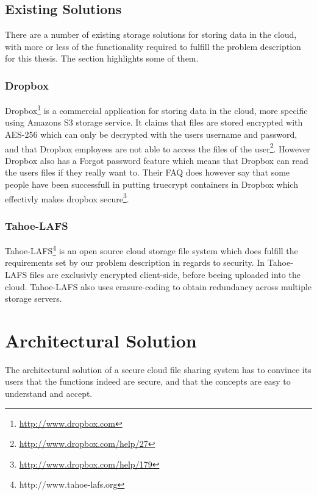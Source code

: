 \documentclass[pdftex,english,10pt,b5paper,twoside]{book}
\begin{document}
\section{Existing Solutions}
There are a number of existing storage solutions for storing data in the cloud,
with more or less of the functionality required to fulfill the problem
description for this thesis. The section highlights some of them.

\subsection{Dropbox} Dropbox\footnote{\url{http://www.dropbox.com}} is a
commercial application for storing data in the cloud, more specific using
Amazons S3 storage service. It claims that files are stored encrypted with
\ac{AES}-256 which can only be decrypted with the users username and password,
and that Dropbox employees are not able to access the files of the
user\footnote{\url{http://www.dropbox.com/help/27}}. However Dropbox also has a
Forgot password feature which means that Dropbox can read the users files if
they really want to. Their \ac{FAQ} does however say that some people have been
successfull in putting truecrypt containers in Dropbox which effectivly makes
dropbox secure\footnote{\url{http://www.dropbox.com/help/179}}.

\subsection{Tahoe-LAFS}
Tahoe-\ac{LAFS}\footnote{http://www.tahoe-lafs.org} is an open source
cloud storage file system which does fulfill the requirements set by our
problem description in regards to security. In Tahoe-\ac{LAFS} files are
exclusivly encrypted client-side, before beeing uploaded into the cloud.
Tahoe-\ac{LAFS} also uses erasure-coding to obtain redundancy across multiple
storage servers.


\chapter{Architectural Solution}
\label{chap:AS}

The architectural solution of a secure cloud file sharing system has to convince
its users that the functions indeed are secure, and that the concepts are easy
to understand and accept.
\end{document}
